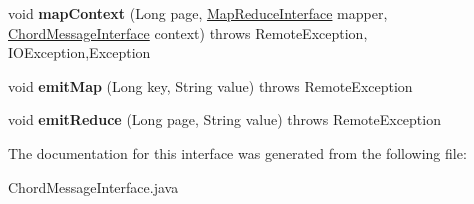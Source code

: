 \begin{DoxyCompactItemize}
\item 
\mbox{\label{interface_chord_message_interface_a6c0446393624049bded3625f5f41499d}} 
void {\bfseries map\+Context} (Long page, \mbox{\hyperlink{interface_map_reduce_interface}{Map\+Reduce\+Interface}} mapper, \mbox{\hyperlink{interface_chord_message_interface}{Chord\+Message\+Interface}} context)  throws Remote\+Exception, I\+O\+Exception,\+Exception 
\item 
\mbox{\label{interface_chord_message_interface_aa6322b11ad33217d05477ed2cef560bb}} 
void {\bfseries emit\+Map} (Long key, String value)  throws Remote\+Exception
\item 
\mbox{\label{interface_chord_message_interface_a4c2d3d7293780603d3dc310bba64e631}} 
void {\bfseries emit\+Reduce} (Long page, String value)  throws Remote\+Exception
\end{DoxyCompactItemize}


The documentation for this interface was generated from the following file\+:\begin{DoxyCompactItemize}
\item 
Chord\+Message\+Interface.\+java\end{DoxyCompactItemize}
